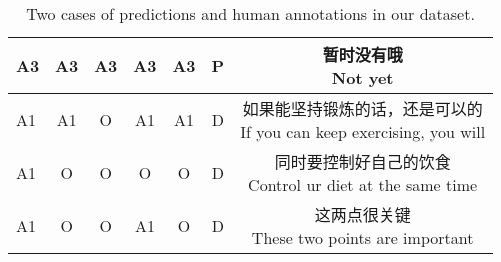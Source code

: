 \documentclass[letterpaper]{article} %
\begin{document}
\begin{CJK}{UTF8}{gbsn}
\begin{table*}[h]
\begin{tabular}{p{1.5cm}<{\centering}cccccc}
			\hline
			A3&A3&A3&A3&A3&P&\makecell{暂时没有哦\\Not yet}\\
			\hline
			A1&A1&O &A1&A1&D&\makecell{如果能坚持锻炼的话，还是可以的\\If you can keep exercising, you will}\\
			\hline
			A1&O &O &O &O &D&\makecell{同时要控制好自己的饮食\\Control ur diet at the same time}\\
			\hline
			A1&O &O &A1&O &D&\makecell{这两点很关键\\These two points are important}\\			
			\bottomrule[1.3pt]
		\end{tabular}
		\caption{Two cases of predictions and human annotations in our dataset.}
		\label{tab:case1}
	\end{table*}
	
	
\end{CJK}
\end{document}
